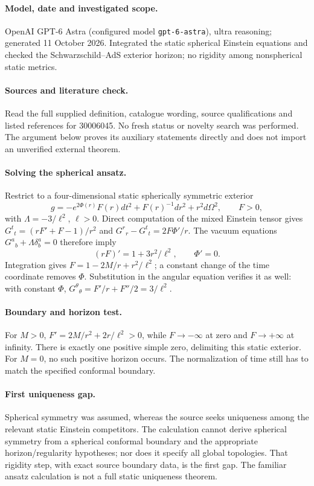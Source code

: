 \documentclass[11pt]{article}
\begin{document}
\paragraph{Model, date and investigated scope.}
OpenAI GPT-6 Astra (configured model \texttt{gpt-6-astra}), ultra reasoning; generated 11 October 2026. Integrated the static spherical Einstein equations and checked the Schwarzschild–AdS exterior horizon; no rigidity among nonspherical static metrics.

\paragraph{Sources and literature check.}
Read the full supplied definition, catalogue wording, source qualifications and listed references for 30006045. No fresh status or novelty search was performed. The argument below proves its auxiliary statements directly and does not import an unverified external theorem.

\paragraph{Solving the spherical ansatz.} Restrict to a four-dimensional static spherically symmetric exterior
\[
 g=-e^{2\Phi(r)}F(r)dt^2+F(r)^{-1}dr^2+r^2d\Omega^2,
 \qquad F>0,
\]
with \(\Lambda=-3/\ell^2\), \(\ell>0\). Direct computation of the mixed Einstein tensor gives \(G^t{}_t=(rF'+F-1)/r^2\) and \(G^r{}_r-G^t{}_t=2F\Phi'/r\). The vacuum equations \(G^a{}_b+\Lambda\delta^a_b=0\) therefore imply
\[
 (rF)'=1+3r^2/\ell^2,\qquad \Phi'=0.
\]
Integration gives \(F=1-2M/r+r^2/\ell^2\); a constant change of the time coordinate removes \(\Phi\). Substitution in the angular equation verifies it as well: with constant \(\Phi\), \(G^\theta{}_\theta=F'/r+F''/2=3/\ell^2\).
\paragraph{Boundary and horizon test.} For \(M>0\), \(F'=2M/r^2+2r/\ell^2>0\), while \(F\to-\infty\) at zero and \(F\to+\infty\) at infinity. There is exactly one positive simple zero, delimiting this static exterior. For \(M=0\), no such positive horizon occurs. The normalization of time still has to match the specified conformal boundary.
\paragraph{First uniqueness gap.} Spherical symmetry was assumed, whereas the source seeks uniqueness among the relevant static Einstein competitors. The calculation cannot derive spherical symmetry from a spherical conformal boundary and the appropriate horizon/regularity hypotheses; nor does it specify all global topologies. That rigidity step, with exact source boundary data, is the first gap. The familiar ansatz calculation is not a full static uniqueness theorem.
\end{document}
